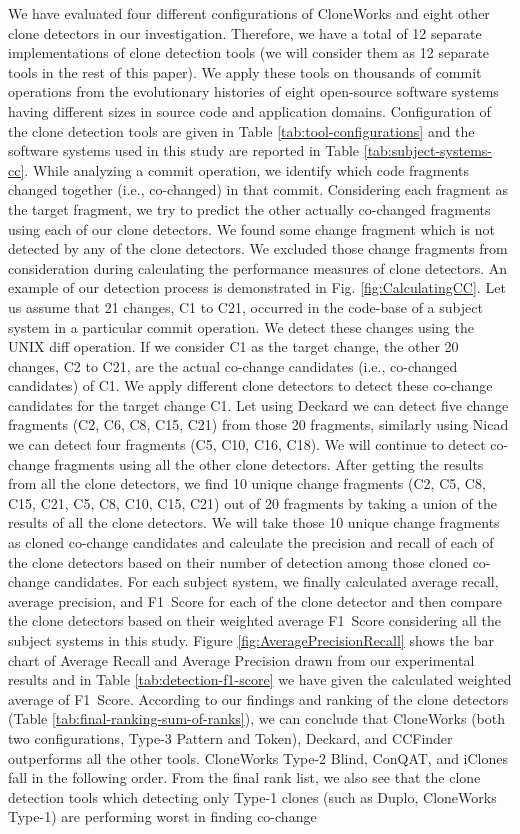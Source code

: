 \documentclass[review]{elsarticle}
\begin{document}
We have evaluated four different configurations of CloneWorks \cite{CloneWorks-Jeff} and eight other clone detectors in our investigation. Therefore, we have a total of 12 separate implementations of clone detection tools (we will consider them as 12 separate tools in the rest of this paper).  We apply these tools on thousands of commit operations from the evolutionary histories of eight open-source software systems having different sizes in source code and application domains. Configuration of the clone detection tools are given in Table \ref{tab:tool-configurations} and the software systems used in this study are reported in Table \ref{tab:subject-systems-cc}. While analyzing a commit operation, we identify which code fragments changed together (i.e., co-changed) in that commit. Considering each fragment as the target fragment, we try to predict the other actually co-changed fragments using each of our clone detectors. We found some change fragment which is not detected by any of the clone detectors. We excluded those change fragments from consideration during calculating the performance measures of clone detectors. An example of our detection process is demonstrated in Fig. \ref{fig:CalculatingCC}. Let us assume that 21 changes, C1 to C21, occurred in the code-base of a subject system in a particular commit operation. We detect these changes using the UNIX diff operation. If we consider C1 as the target change, the other 20 changes, C2 to C21, are the actual co-change candidates (i.e., co-changed candidates) of C1. We apply different clone detectors to detect these co-change candidates for the target change C1. Let using Deckard we can detect five change fragments (C2, C6, C8, C15, C21) from those 20 fragments, similarly using Nicad we can detect four fragments (C5, C10, C16, C18). We will continue to detect co-change fragments using all the other clone detectors. After getting the results from all the clone detectors, we find 10 unique change fragments (C2, C5, C8, C15, C21, C5, C8, C10, C15, C21) out of 20 fragments by taking a union of the results of all the clone detectors. We will take those 10 unique change fragments as cloned co-change candidates and calculate the precision and recall of each of the clone detectors based on their number of detection among those cloned co-change candidates. For each subject system, we finally calculated average recall, average precision, and F1~Score for each of the clone detector and then compare the clone detectors based on their weighted average F1~Score considering all the subject systems in this study. Figure \ref{fig:AveragePrecisionRecall} shows the bar chart of Average Recall and Average Precision drawn from our experimental results and in Table \ref{tab:detection-f1-score} we have given the calculated weighted average of F1~Score. According to our findings and ranking of the clone detectors (Table \ref{tab:final-ranking-sum-of-ranks}), we can conclude that CloneWorks (both two configurations, Type-3 Pattern and Token), Deckard, and CCFinder outperforms all the other tools. CloneWorks Type-2 Blind, ConQAT, and iClones fall in the following order. From the final rank list, we also see that the clone detection tools which detecting only Type-1 clones (such as Duplo, CloneWorks Type-1) are performing worst in finding co-change 
\end{document}
